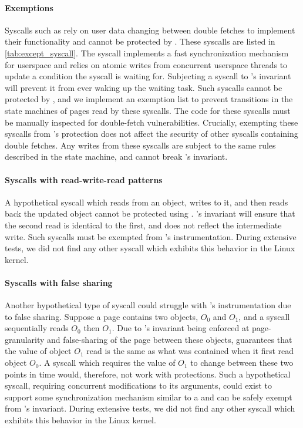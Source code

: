 \documentclass[letterpaper,twocolumn,10pt]{article}
\begin{document}
\paragraph{Exemptions}
Syscalls such as  rely on user data changing between double 
fetches to implement their functionality and cannot be protected by
\tiktok.
These syscalls are listed in \autoref{tab:except_syscall}.
The  syscall implements a fast synchronization mechanism
for userspace and relies on atomic writes from concurrent userspace
threads to update a condition the syscall is waiting for. 
Subjecting a  syscall to \tiktok's invariant will prevent
it from ever waking up the waiting task.
Such syscalls cannot be protected by \tiktok, and we implement an 
exemption list to prevent transitions in the state machines of pages read 
by these syscalls.
The code for these syscalls must be manually inspected for double-fetch 
vulnerabilities.
Crucially, exempting these syscalls from \tiktok's protection does not 
affect the security of other syscalls containing double fetches. 
Any writes from these syscalls are subject to the same rules described
in the state machine, and cannot break \tiktok's invariant.


\paragraph{Syscalls with read-write-read patterns}
A hypothetical syscall which reads from an object, writes to it, and
then reads back the updated object cannot be protected using \tiktok.
\tiktok's invariant will ensure that the second read is identical to the first,
and does not reflect the intermediate write.
Such syscalls must be exempted from \tiktok's instrumentation.
During extensive tests, we did not find any other syscall which exhibits this behavior in the Linux
kernel. 

\paragraph{Syscalls with false sharing}
Another hypothetical type of syscall could struggle with \tiktok's 
instrumentation due to false sharing.
Suppose a page contains two objects, $O_0$ and $O_1$, and a syscall  
sequentially reads $O_0$ then $O_1$.
Due to \tiktok's invariant being enforced at page-granularity and 
false-sharing of the page between these objects, \tiktok guarantees that
the value of object $O_1$ read is the same as what was contained when it 
first read object $O_0$. 
A syscall which requires the value of $O_1$ to change between these two 
points in time would, therefore, not work with \tiktok protections. 
Such a hypothetical syscall, requiring concurrent modifications to its 
arguments, could exist to support some synchronization mechanism 
similar to a  and can be safely exempt from \tiktok's invariant.
%
During extensive tests, we did not find any other syscall which exhibits this behavior in the 
Linux kernel. 
\end{document}

